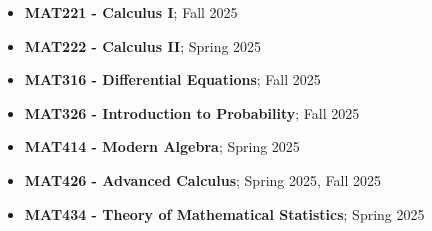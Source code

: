\documentclass[12pt]{book}
\begin{document}
\begin{itemize}
	\item \textbf{MAT221 - Calculus I}; Fall 2025
	\item \textbf{MAT222 - Calculus II}; Spring 2025
	\item \textbf{MAT316 - Differential Equations}; Fall 2025
	\item \textbf{MAT326 - Introduction to Probability}; Fall 2025
	\item \textbf{MAT414 - Modern Algebra}; Spring 2025
	\item \textbf{MAT426 - Advanced Calculus}; Spring 2025, Fall 2025
	\item \textbf{MAT434 - Theory of Mathematical Statistics}; Spring 2025




\end{itemize}
\end{document}
